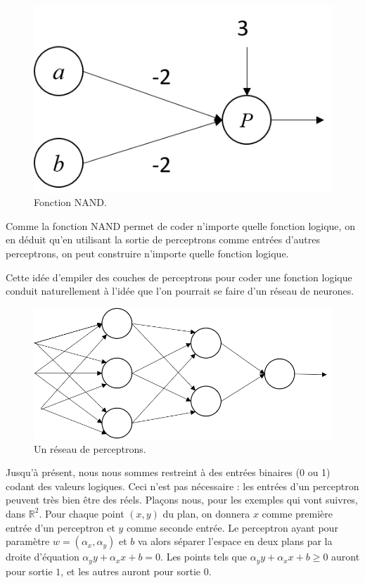 \begin{figure}[h]
  \centering
  \includegraphics[scale=0.5]{assets/nand-perceptron}
  \caption{Fonction NAND.}
  \label{fig:nand-perceptron}
\end{figure}

Comme la fonction NAND permet de coder n'importe quelle fonction logique, 
on en déduit qu'en utilisant la sortie de perceptrons comme entrées d'autres 
perceptrons, on peut construire n'importe quelle fonction logique.

Cette idée d'empiler des couches de perceptrons pour coder une fonction logique 
conduit naturellement à l'idée que l'on pourrait se faire d'un réseau de neurones.

\begin{figure}[h]
  \centering
  \includegraphics[scale=0.5]{assets/perceptron-network}
  \caption{Un réseau de perceptrons.}
  \label{fig:perceptron-network}
\end{figure}

Jusqu'à présent, nous nous sommes restreint à des entrées binaires (0 ou 1) 
codant des valeurs logiques. Ceci n'est pas nécessaire : les entrées d'un perceptron 
peuvent très bien être des réels.
Plaçons nous, pour les exemples qui vont suivres, dans $\mathbb{R}^2$. 
Pour chaque point $(x, y)$ du plan, on donnera $x$ comme première entrée d'un 
perceptron et $y$ comme seconde entrée. 
Le perceptron ayant pour paramètre $w=(\alpha_x, \alpha_y)$ et $b$ va alors 
séparer l'espace en deux plans par la droite d'équation $\alpha_y y + \alpha_x x + b = 0$. 
Les points tels que $\alpha_y y + \alpha_x x + b \geq 0$ auront pour sortie $1$, et 
les autres auront pour sortie $0$.

